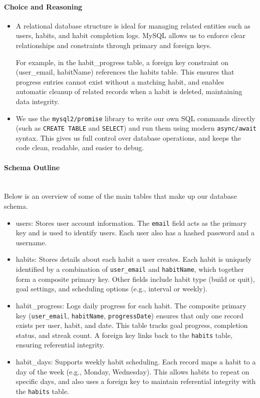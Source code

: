 \paragraph{Choice and Reasoning}
\begin{itemize}
  \item A relational database structure is ideal for managing related entities such as users, habits, and habit completion logs. MySQL allows us to enforce clear relationships and constraints through primary and foreign keys.
  
  For example, in the habit\_progress table, a foreign key constraint on (user\_email, habitName) references the habits table. This ensures that progress entries cannot exist without a matching habit, and enables automatic cleanup of related records when a habit is deleted, maintaining data integrity.

  \item We use the \texttt{mysql2/promise} library to write our own SQL commands directly (such as \texttt{CREATE TABLE} and \texttt{SELECT}) and run them using modern \texttt{async/await} syntax. This gives us full control over database operations, and keeps the code clean, readable, and easier to debug.
\end{itemize}

\paragraph{Schema Outline}\mbox{}\\
Below is an overview of some of the main tables that make up our database schema.
\begin{itemize}

  \item {users}: Stores user account information. The \texttt{email} field acts as the primary key and is used to identify users. Each user also has a hashed password and a username.

  \item {habits}: Stores details about each habit a user creates. Each habit is uniquely identified by a combination of \texttt{user\_email} and \texttt{habitName}, which together form a composite primary key. Other fields include habit type (build or quit), goal settings, and scheduling options (e.g., interval or weekly).

  \item {habit\_progress}: Logs daily progress for each habit. The composite primary key (\texttt{user\_email}, \texttt{habitName}, \texttt{progressDate}) ensures that only one record exists per user, habit, and date. This table tracks goal progress, completion status, and streak count. A foreign key links back to the \texttt{habits} table, ensuring referential integrity.

\item {habit\_days}: Supports weekly habit scheduling. Each record maps a habit to a day of the week (e.g., Monday, Wednesday). This allows habits to repeat on specific days, and also uses a foreign key to maintain referential integrity with the \texttt{habits} table.

\end{itemize}

